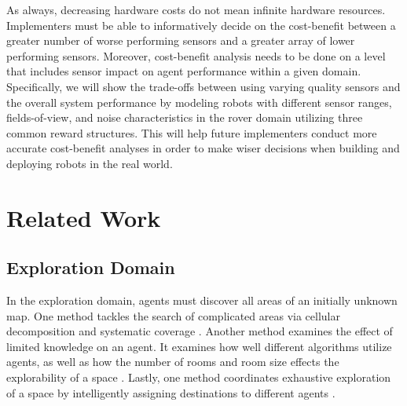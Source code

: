 \documentclass[letterpaper, 10 pt, conference]{ieeeconf}  %
\begin{document}
As always, decreasing hardware costs do not mean infinite hardware resources.
Implementers must be able to informatively decide on the cost-benefit 
between a greater number of worse performing sensors and a greater array of lower performing sensors. Moreover, cost-benefit analysis needs to be done on a level that includes sensor impact on  agent performance within a given domain. Specifically, we will show the trade-offs between using varying quality sensors and the overall system performance by modeling robots with different sensor ranges, fields-of-view, and noise characteristics in the rover domain utilizing three common reward structures. This will help future implementers conduct more accurate cost-benefit analyses in order to make wiser decisions when building and deploying robots in the real world.


\section{Related Work}
\subsection{Exploration Domain}
In the exploration domain, agents must discover all areas of an
initially unknown map. One method tackles the search of complicated
areas via cellular decomposition and systematic coverage \cite{choset2001coverage}. Another
method examines the effect of limited knowledge on an agent. It
examines how well different algorithms utilize agents, as well as how
the number of rooms and room size effects the explorability of a space
\cite{ferranti2007brick}. Lastly, one method coordinates exhaustive exploration of a space
by intelligently assigning destinations to different agents \cite{burgard2005coordinated}.
\end{document}
